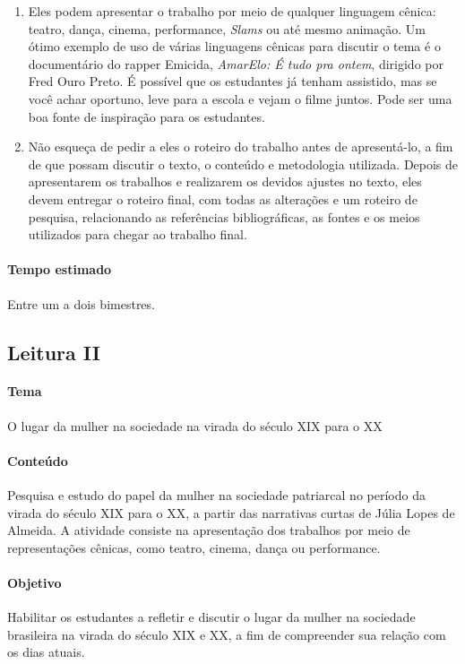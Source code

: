 \documentclass[12pt]{extarticle}
\begin{document}
\begin{enumerate}
\item
Eles podem apresentar o trabalho por meio de qualquer linguagem
cênica: teatro, dança, cinema, performance, \emph{Slams} ou até mesmo
animação. Um ótimo exemplo de uso de várias linguagens cênicas para
discutir o tema é o documentário do rapper Emicida, \emph{AmarElo: É
tudo pra ontem}, dirigido por Fred Ouro Preto. É possível que os
estudantes já tenham assistido, mas se você achar oportuno, leve para a
escola e vejam o filme juntos. Pode ser uma boa fonte de inspiração para
os estudantes.

\item
Não esqueça de pedir a eles o roteiro do trabalho antes de
apresentá-lo, a fim de que possam discutir o texto, o conteúdo e
metodologia utilizada. Depois de apresentarem os trabalhos e realizarem
os devidos ajustes no texto, eles devem entregar o roteiro final, com
todas as alterações e um roteiro de pesquisa, relacionando as
referências bibliográficas, as fontes e os meios utilizados para chegar
ao trabalho final.
\end{enumerate}

\paragraph{Tempo estimado} Entre um a dois bimestres.



\subsection{Leitura II}




\paragraph{Tema} O lugar da mulher na sociedade na virada do século XIX para o XX



\paragraph{Conteúdo} Pesquisa e estudo do papel da mulher na sociedade
patriarcal no período da virada do século XIX para o XX, a partir das
narrativas curtas de Júlia Lopes de Almeida. A atividade consiste na
apresentação dos trabalhos por meio de representações cênicas, como
teatro, cinema, dança ou performance.

\paragraph{Objetivo} Habilitar os estudantes a refletir e discutir o lugar
da mulher na sociedade brasileira na virada do século XIX e XX, a fim de
compreender sua relação com os dias atuais.
\end{document}
